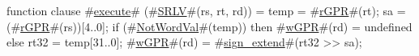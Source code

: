 function clause #\hyperref[zexecute]{execute}# (#\hyperref[zSRLV]{SRLV}#(rs, rt, rd)) =
  {
    temp = #\hyperref[zrGPR]{rGPR}#(rt);
    sa   = (#\hyperref[zrGPR]{rGPR}#(rs))[4..0];
    if (#\hyperref[zNotWordVal]{NotWordVal}#(temp)) then
      #\hyperref[zwGPR]{wGPR}#(rd) = undefined
    else {
      rt32 = temp[31..0];
      #\hyperref[zwGPR]{wGPR}#(rd) = #\hyperref[zsignzyextend]{sign\_extend}#(rt32 >> sa);
    }
  }
